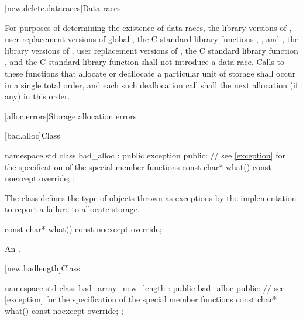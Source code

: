 [new.delete.dataraces]{Data races}

\pnum
For purposes of determining the existence of data races, the library versions
of , user replacement versions of global ,
the C standard library functions
, , and ,
the library
versions of , user replacement
versions of , the C standard library function
, and the C standard library function  shall not
introduce a data race.
Calls to these functions that allocate or deallocate a particular unit
of storage shall occur in a single total order, and each such deallocation call
shall 
the next allocation (if any) in this order.

[alloc.errors]{Storage allocation errors}

%
[bad.alloc]{Class }

%
\begin{codeblock}
namespace std {
  class bad_alloc : public exception {
  public:
    // see \ref{exception} for the specification of the special member functions
    const char* what() const noexcept override;
  };
}
\end{codeblock}

\pnum
The class
defines the type of objects thrown as
exceptions by the implementation to report a failure to allocate storage.

%
\begin{itemdecl}
const char* what() const noexcept override;
\end{itemdecl}

\begin{itemdescr}
\pnum
\returns
An  \ntbs{}.
\end{itemdescr}

%
%
[new.badlength]{Class }

\begin{codeblock}
namespace std {
  class bad_array_new_length : public bad_alloc {
  public:
    // see \ref{exception} for the specification of the special member functions
    const char* what() const noexcept override;
  };
}
\end{codeblock}

